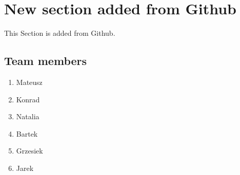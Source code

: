 \section{New section added from Github}

This Section is added from Github. 

\subsection{Team members}
\begin{enumerate}
  \item Mateusz
  \item Konrad
  \item Natalia
  \item Bartek
  \item Grzesiek
  \item Jarek

\end{enumerate}
